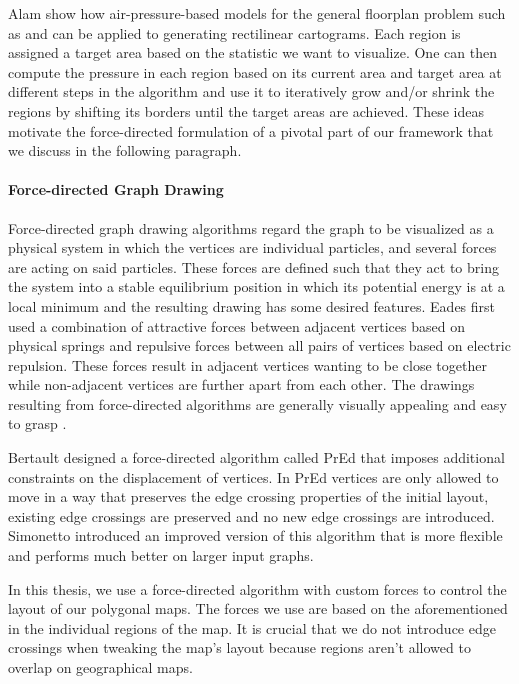 Alam \etal{} \cite{alam2013computing} show how air-pressure-based models for the general floorplan problem such as \cite{izumi1998air} and \cite{felsner2013exploiting} can be applied to generating rectilinear cartograms.
Each region is assigned a target area based on the statistic we want to visualize.
One can then compute the pressure in each region based on its current area and target area at different steps in the algorithm and use it to iteratively grow and/or shrink the regions by shifting its borders until the target areas are achieved.
These ideas motivate the force-directed formulation of a pivotal part of our framework that we discuss in the following paragraph.


\paragraph{Force-directed Graph Drawing}

Force-directed graph drawing algorithms regard the graph to be visualized as a physical system in which the vertices are individual particles, and several forces are acting on said particles.
These forces are defined such that they act to bring the system into a stable equilibrium position in which its potential energy is at a local minimum and the resulting drawing has some desired features.
 Eades \cite{eades84heuristic} first used a combination of attractive forces between adjacent vertices based on physical springs and repulsive forces between all pairs of vertices based on electric repulsion.
These forces result in adjacent vertices wanting to be close together while non-adjacent vertices are further apart from each other.
The drawings resulting from force-directed algorithms are generally visually appealing and easy to grasp \cite{kobourov2013force}.

Bertault \cite{bertault1999force} designed a force-directed algorithm called PrEd that imposes additional constraints on the displacement of vertices.
In PrEd vertices are only allowed to move in a way that preserves the edge crossing properties of the initial layout, \ie{} existing edge crossings are preserved and no new edge crossings are introduced.
Simonetto \etal{} \cite{simonetto2011impred} introduced an improved version of this algorithm that is more flexible and performs much better on larger input graphs.

In this thesis, we use a force-directed algorithm with custom forces to control the layout of our polygonal maps.
The forces we use are based on the aforementioned  in the individual regions of the map.
It is crucial that we do not introduce edge crossings when tweaking the map's layout because regions aren't allowed to overlap on geographical maps.


